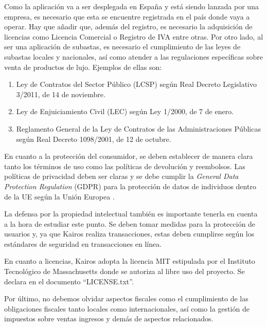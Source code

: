 	Como la aplicación va a ser desplegada en España y está siendo lanzada por una empresa, es necesario que esta se encuentre registrada en el país donde vaya a operar. Hay que añadir que, además del registro, es necesario la adquisición de licencias como Licencia Comercial o Registro de IVA entre otras. Por otro lado, al ser una aplicación de subastas, es necesario el cumplimiento de las leyes de subastas locales y nacionales, así como atender a las regulaciones específicas sobre venta de productos de lujo. Ejemplos de ellas son:
	\begin{enumerate}
		\item Ley de Contratos del Sector Público (LCSP) según Real Decreto Legislativo 3/2011, de 14 de noviembre. \cite{leySectorPublico}
		\item Ley de Enjuiciamiento Civil (LEC) según Ley 1/2000, de 7 de enero. \cite{leyEnjuiciamiento}
		\item Reglamento General de la Ley de Contratos de las Administraciones Públicas según Real Decreto 1098/2001, de 12 de octubre. \cite{leyContratos}
	\end{enumerate}
	
	En cuanto a la protección del consumidor, se deben establecer de manera clara tanto los términos de uso como las políticas de devolución y reembolsos. Las políticas de privacidad deben ser claras y se debe cumplir la \emph{General Data Protection Regulation} (GDPR) para la protección de datos de individuos dentro de la UE según la Unión Europea \cite{RGPD}.
	
	La defensa por la propiedad intelectual también es importante tenerla en cuenta a la hora de estudiar este punto. Se deben tomar medidas para la protección de usuarios y, ya que Kairos realiza transacciones, estas deben cumplirse según los estándares de seguridad en transacciones en línea.
	
	En cuanto a licencias, Kairos adopta la licencia MIT estipulada por el Instituto Tecnológico de Massachusetts \cite{mit} donde se autoriza al libre uso del proyecto. Se declara en el documento ``LICENSE.txt''.
	
	Por último, no debemos olvidar aspectos fiscales como el cumplimiento de las obligaciones fiscales tanto locales como internacionales, así como la gestión de impuestos sobre ventas ingresos y demás de aspectos relacionados.	


